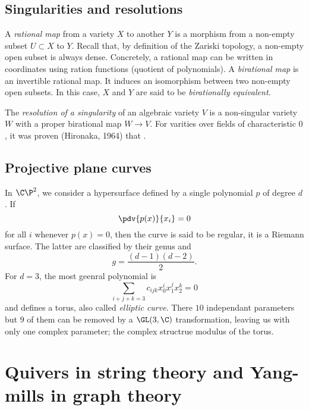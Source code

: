     \subsection{Singularities and resolutions}

        A \emph{rational map} from a variety $X$ to another $Y$ is a morphism from a non-empty subset $U\subset X$ to $Y$. Recall that, by definition of the Zariski topology, a non-empty open subset is always dense. Concretely, a rational map can be written in coordinates using ration functions (quotient of polynomials). A \emph{birational map} is an invertible rational map. It induces an isomorphism between two non-empty open subsets. In this case, $X$ and $Y$ are said to be \emph{birationally equivalent}.

        The \emph{resolution of a singularity} of an algebraic variety $V$ is a non-singular variety $W$ with a proper birational map $W\to V$. For varities over fields of characteristic $0$, it was proven (Hironaka, 1964) that .

    \subsection{Projective plane curves}

        In $\C\P^2$, we consider a hypersurface defined by a single polynomial $p$ of degree $d$. If
        \begin{equation}
            \pdv{p(x)}{x_i}=0
        \end{equation}
        for all $i$ whenever $p(x)=0$, then the curve is said to be regular, it is a Riemann surface. The latter are classified by their genus and
        \begin{equation}
            g=\frac{(d-1)(d-2)}{2}.
        \end{equation}
        For $d=3$, the most geenral polynomial is
        \begin{equation}
            \sum_{i+j+k=3}c_{ijk}x^i_0x^j_1x^k_2=0
        \end{equation}
        and defines a torus, also called \emph{elliptic curve}. There $10$ independant parameters but $9$ of them can be removed by a $\GL(3,\C)$ transformation, leaving us with only one complex parameter; the complex structrue modulus of the torus.





\section{Quivers in string theory and Yang-mills in graph theory}